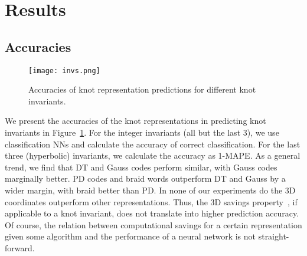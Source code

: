 \documentclass[11pt]{article}
\numberwithin{equation}{section}
\begin{document}
\section{Results}
\label{sec:Results}
\subsection{Accuracies}

\begin{figure}[t]
    \centering
    \texttt{[image: invs.png]}
    \caption{Accuracies of knot representation predictions for different knot invariants.}
    \label{fig:int_invs}
\end{figure}

We present the accuracies of the knot representations in predicting knot invariants in Figure~\ref{fig:int_invs}. For the integer invariants (all but the last 3), we use classification NNs and calculate the accuracy of correct classification. For the last three (hyperbolic) invariants, we calculate the accuracy as 1-MAPE. As a general trend, we find that DT and Gauss codes perform similar, with Gauss codes marginally better. PD codes and braid words outperform DT and Gauss by a wider margin, with braid better than PD. In none of our experiments do the 3D coordinates outperform other representations. Thus, the 3D savings property~\cite{BarNatan:2024aaa}, if applicable to a knot invariant, does not translate into higher prediction accuracy. Of course, the relation between computational savings for a certain representation given some algorithm and the performance of a neural network is not straight-forward.
\end{document}
